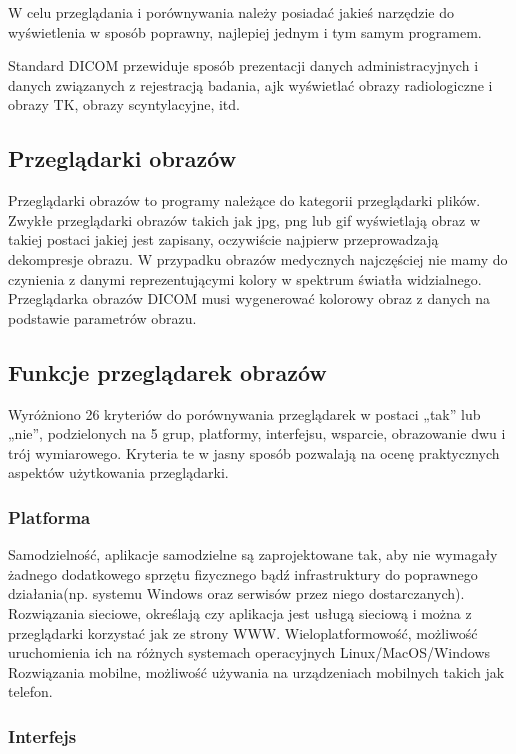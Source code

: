 
\par
W celu przeglądania i porównywania należy posiadać jakieś narzędzie do wyświetlenia w sposób poprawny, najlepiej jednym i tym samym programem.
\par
Standard DICOM przewiduje sposób prezentacji danych administracyjnych i danych związanych z rejestracją badania, ajk wyświetlać obrazy radiologiczne i obrazy TK, obrazy scyntylacyjne, itd.

\subsection{Przeglądarki obrazów}

Przeglądarki obrazów to programy należące do kategorii przeglądarki plików.
Zwykłe przeglądarki obrazów takich jak jpg, png lub gif wyświetlają obraz w takiej postaci jakiej jest zapisany, oczywiście najpierw przeprowadzają dekompresje obrazu.
W przypadku obrazów medycznych najczęściej nie mamy do czynienia z danymi reprezentującymi kolory w spektrum światła widzialnego.
Przeglądarka obrazów DICOM musi wygenerować kolorowy obraz z danych na podstawie parametrów obrazu.

\subsection{Funkcje przeglądarek obrazów}

Wyróżniono 26 kryteriów do porównywania przeglądarek w postaci „tak” lub „nie”, podzielonych na 5 grup, platformy, interfejsu, wsparcie, obrazowanie dwu i trój wymiarowego.
Kryteria te w jasny sposób pozwalają na ocenę praktycznych aspektów użytkowania przeglądarki.

\subsubsection{Platforma}

Samodzielność, aplikacje samodzielne są zaprojektowane tak, aby nie wymagały żadnego dodatkowego sprzętu fizycznego bądź infrastruktury do poprawnego działania(np. systemu Windows oraz serwisów przez niego dostarczanych).
Rozwiązania sieciowe, określają czy aplikacja jest usługą sieciową i można z przeglądarki korzystać jak ze strony WWW.
Wieloplatformowość, możliwość uruchomienia ich na różnych systemach operacyjnych Linux/MacOS/Windows
Rozwiązania mobilne, możliwość używania na urządzeniach mobilnych takich jak telefon.

\subsubsection{Interfejs}

